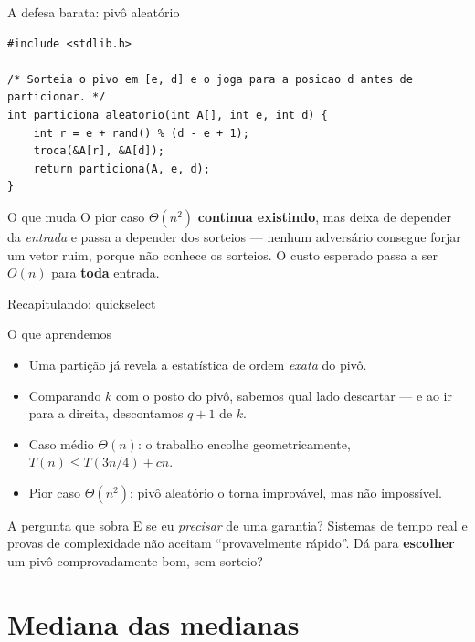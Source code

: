 \documentclass[aspectratio=169]{beamer}
\begin{document}
\begin{frame}[fragile]{A defesa barata: pivô aleatório}
\begin{lstlisting}
#include <stdlib.h>

/* Sorteia o pivo em [e, d] e o joga para a posicao d antes de particionar. */
int particiona_aleatorio(int A[], int e, int d) {
    int r = e + rand() % (d - e + 1);
    troca(&A[r], &A[d]);
    return particiona(A, e, d);
}
\end{lstlisting}

  \begin{block}{O que muda}
    O pior caso $\Theta(n^2)$ \textbf{continua existindo}, mas deixa de depender
    da \emph{entrada} e passa a depender dos sorteios --- nenhum adversário
    consegue forjar um vetor ruim, porque não conhece os sorteios.
    O custo esperado passa a ser $O(n)$ para \textbf{toda} entrada.
  \end{block}
\end{frame}

\begin{frame}{Recapitulando: quickselect}
  \begin{block}{O que aprendemos}
    \begin{itemize}
      \item Uma partição já revela a estatística de ordem \emph{exata} do pivô.
      \item Comparando $k$ com o posto do pivô, sabemos qual lado descartar ---
            e ao ir para a direita, descontamos $q+1$ de $k$.
      \item Caso médio $\Theta(n)$: o trabalho encolhe geometricamente,
            $T(n) \le T(3n/4) + cn$.
      \item Pior caso $\Theta(n^2)$; pivô aleatório o torna improvável, mas não
            impossível.
    \end{itemize}
  \end{block}

  \begin{exampleblock}{A pergunta que sobra}
    E se eu \emph{precisar} de uma garantia? Sistemas de tempo real e provas de
    complexidade não aceitam ``provavelmente rápido''.
    Dá para \textbf{escolher} um pivô comprovadamente bom, sem sorteio?
  \end{exampleblock}
\end{frame}

\section{Mediana das medianas}
\end{document}
